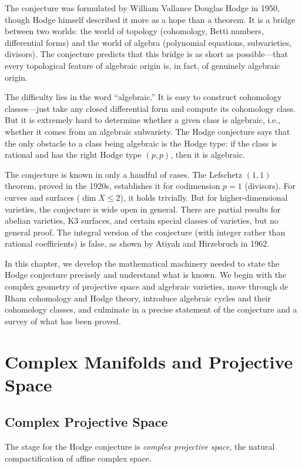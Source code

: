 The conjecture was formulated by William Vallance Douglas Hodge in 1950, though Hodge himself described it more as a hope than a theorem. It is a bridge between two worlds: the world of topology (cohomology, Betti numbers, differential forms) and the world of algebra (polynomial equations, subvarieties, divisors). The conjecture predicts that this bridge is as short as possible---that every topological feature of algebraic origin is, in fact, of genuinely algebraic origin.

The difficulty lies in the word ``algebraic.'' It is easy to construct cohomology classes---just take any closed differential form and compute its cohomology class. But it is extremely hard to determine whether a given class is algebraic, i.e., whether it comes from an algebraic subvariety. The Hodge conjecture says that the only obstacle to a class being algebraic is the Hodge type: if the class is rational and has the right Hodge type $(p,p)$, then it is algebraic.

The conjecture is known in only a handful of cases. The Lefschetz $(1,1)$ theorem, proved in the 1920s, establishes it for codimension $p = 1$ (divisors). For curves and surfaces ($\dim X \le 2$), it holds trivially. But for higher-dimensional varieties, the conjecture is wide open in general. There are partial results for abelian varieties, K3 surfaces, and certain special classes of varieties, but no general proof. The integral version of the conjecture (with integer rather than rational coefficients) is false, as shown by Atiyah and Hirzebruch in 1962.

In this chapter, we develop the mathematical machinery needed to state the Hodge conjecture precisely and understand what is known. We begin with the complex geometry of projective space and algebraic varieties, move through de Rham cohomology and Hodge theory, introduce algebraic cycles and their cohomology classes, and culminate in a precise statement of the conjecture and a survey of what has been proved.

\section{Complex Manifolds and Projective Space}

\subsection{Complex Projective Space}

The stage for the Hodge conjecture is \emph{complex projective space}, the natural compactification of affine complex space.

